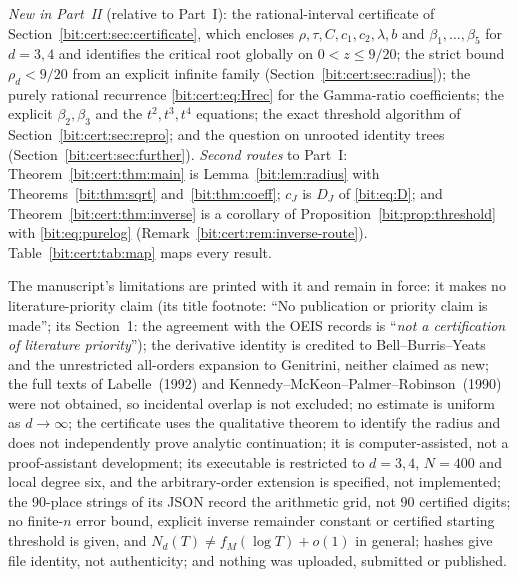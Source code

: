 \documentclass[11pt]{article}
\theoremstyle{definition}\newtheorem{definition}[theorem]{Definition}
\theoremstyle{remark}\newtheorem{remark}[theorem]{Remark}
\begin{document}
\emph{New in Part~II} (relative to Part~I): the rational-interval certificate
of Section~\ref{bit:cert:sec:certificate}, which encloses
$\rho,\tau,C,c_1,c_2,\lambda,b$ and $\beta_1,\ldots,\beta_5$ for $d=3,4$ and
identifies the critical root globally on $0<z\le9/20$; the strict bound
$\rho_d<9/20$ from an explicit infinite family
(Section~\ref{bit:cert:sec:radius}); the purely rational recurrence
\eqref{bit:cert:eq:Hrec} for the Gamma-ratio coefficients; the explicit
$\beta_2,\beta_3$ and the $t^2,t^3,t^4$ equations; the exact threshold
algorithm of Section~\ref{bit:cert:sec:repro}; and the question on unrooted
identity trees (Section~\ref{bit:cert:sec:further}).
\emph{Second routes} to Part~I: Theorem~\ref{bit:cert:thm:main} is
Lemma~\ref{bit:lem:radius} with Theorems~\ref{bit:thm:sqrt}
and~\ref{bit:thm:coeff}; $c_J$ is $D_J$ of \eqref{bit:eq:D}; and
Theorem~\ref{bit:cert:thm:inverse} is a corollary of
Proposition~\ref{bit:prop:threshold} with \eqref{bit:eq:purelog}
(Remark~\ref{bit:cert:rem:inverse-route}). Table~\ref{bit:cert:tab:map} maps
every result.

The manuscript's limitations are printed with it and remain in force: it
makes no literature-priority claim (its title footnote: ``No publication or
priority claim is made''; its Section~1: the agreement with the OEIS records
is ``\emph{not a certification of literature priority}''); the derivative
identity is credited to Bell--Burris--Yeats and the unrestricted all-orders
expansion to Genitrini, neither claimed as new; the full texts of
Labelle~(1992) and Kennedy--McKeon--Palmer--Robinson~(1990) were not obtained,
so incidental overlap is not excluded; no estimate is uniform as $d\to\infty$;
the certificate uses the qualitative theorem to identify the radius and does
not independently prove analytic continuation; it is computer-assisted, not a
proof-assistant development; its executable is restricted to $d=3,4$, $N=400$
and local degree six, and the arbitrary-order extension is specified, not
implemented; the 90-place strings of its JSON record the arithmetic grid, not
90 certified digits; no finite-$n$ error bound, explicit inverse remainder
constant or certified starting threshold is given, and
$N_d(T)\ne f_M(\log T)+o(1)$ in general; hashes give file identity, not
authenticity; and nothing was uploaded, submitted or published.
\end{document}
